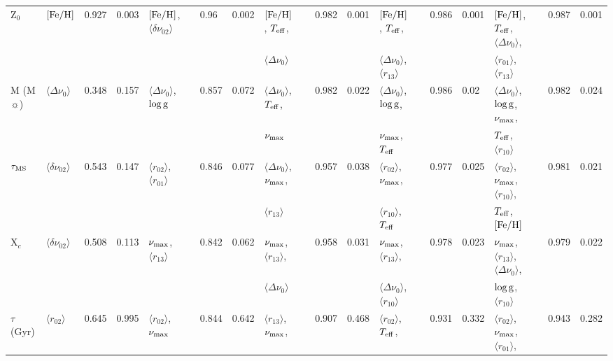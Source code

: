 {\begin{landscape}
\begin{table}
\begin{tabular}{  l | l  l  l | l  l  l  l | l  l  l  l | l  l  l  l | l  l  l  l   }
    Z$_0$ & $[\rm{Fe/H}]$ & 0.927 & 0.003 & $[\rm{Fe/H}]$, $\langle\delta\nu_{02}\rangle$ && 0.96 & 0.002 & $[\rm{Fe/H}]$, $T_{\rm{eff}}$, && 0.982 & 0.001 & $[\rm{Fe/H}]$, $T_{\rm{eff}}$, && 0.986 & 0.001 & $[\rm{Fe/H}]$, $T_{\rm{eff}}$, $\langle\Delta\nu_0\rangle$, && 0.987 & 0.001\\
  &  &  &  &  &  &  &  &  $\langle\Delta\nu_0\rangle$ &  &  &  & $\langle\Delta\nu_0\rangle$, $\langle r_{13}\rangle$ &&  & & $\langle r_{01}\rangle$, $\langle r_{13}\rangle$ &  &  &\\[3pt]
  M (M$\sun$)& $\langle\Delta\nu_0\rangle$ & 0.348 & 0.157 & $\langle\Delta\nu_0\rangle$, $\log \rm{g}$ && 0.857 & 0.072 & $\langle\Delta\nu_0\rangle$, $T_{\rm{eff}}$, && 0.982 & 0.022 & $\langle\Delta\nu_0\rangle$, $\log \rm{g}$, && 0.986 & 0.02 & $\langle\Delta\nu_0\rangle$, $\log \rm{g}$, $\nu_{\rm{max}}$, && 0.982 & 0.024\\
  &  &  &  &  &  &  &  &  $\nu_{\rm{max}}$ &  &  &  & $\nu_{\rm{max}}$, $T_{\rm{eff}}$ &&  & & $T_{\rm{eff}}$, $\langle r_{10}\rangle$ &  &  &\\[3pt] 
    $\tau_{\rm{MS}}$ & $\langle\delta\nu_{02}\rangle$ & 0.543 & 0.147 & $\langle r_{02}\rangle$, $\langle r_{01}\rangle$ && 0.846 & 0.077 & $\langle\Delta\nu_0\rangle$, $\nu_{\rm{max}}$, && 0.957 & 0.038 & $\langle r_{02}\rangle$, $\nu_{\rm{max}}$, && 0.977 & 0.025 & $\langle r_{02}\rangle$, $\nu_{\rm{max}}$, $\langle r_{10}\rangle$, && 0.981 & 0.021\\
  &  &  &  &  &  &  &  &  $\langle r_{13}\rangle$ &  &  &  & $\langle r_{10}\rangle$, $T_{\rm{eff}}$ &&  & & $T_{\rm{eff}}$, $[\rm{Fe/H}]$ &  &  &\\[3pt] 
   X$_c$ & $\langle\delta\nu_{02}\rangle$ & 0.508 & 0.113 & $\nu_{\rm{max}}$, $\langle r_{13}\rangle$ && 0.842 & 0.062 & $\nu_{\rm{max}}$, $\langle r_{13}\rangle$, && 0.958 & 0.031 & $\nu_{\rm{max}}$,  $\langle r_{13}\rangle$,& & 0.978 & 0.023 & $\nu_{\rm{max}}$, $\langle r_{13}\rangle$, $\langle\Delta\nu_0\rangle$, && 0.979 & 0.022\\
  &  &  &  &  &  &  &  &  $\langle\Delta\nu_0\rangle$ &  &  &  & $\langle\Delta\nu_0\rangle$, $\langle r_{10}\rangle$ &&  & & $\log \rm{g}$, $\langle r_{10}\rangle$ &  &  &\\[3pt]
  $\tau$ (Gyr)& $\langle r_{02}\rangle$ & 0.645 & 0.995 & $\langle r_{02}\rangle$, $\nu_{\rm{max}}$ && 0.844 & 0.642 & $\langle r_{13}\rangle$, $\nu_{\rm{max}}$, && 0.907 & 0.468 & $\langle r_{02}\rangle$,  $T_{\rm{eff}}$, && 0.931 & 0.332 & $\langle r_{02}\rangle$, $\nu_{\rm{max}}$, $\langle r_{01}\rangle$, && 0.943 & 0.282\\

\end{tabular}
\end{table}
\end{landscape}}
